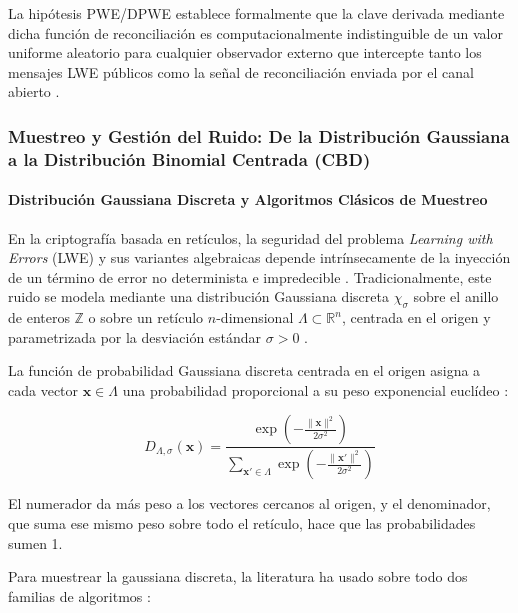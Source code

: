 La hipótesis PWE/DPWE establece formalmente que la clave derivada mediante dicha función de reconciliación es computacionalmente indistinguible de un valor uniforme aleatorio para cualquier observador externo que intercepte tanto los mensajes LWE públicos como la señal de reconciliación enviada por el canal abierto \cite{yang2025multiserver, rewal2023quantumsafe}.

\subsubsection{Muestreo y Gestión del Ruido: De la Distribución Gaussiana a la Distribución Binomial Centrada (CBD)}

\paragraph{Distribución Gaussiana Discreta y Algoritmos Clásicos de Muestreo}

En la criptografía basada en retículos, la seguridad del problema \textit{Learning with Errors} (LWE) y sus variantes algebraicas depende intrínsecamente de la inyección de un término de error no determinista e impredecible \cite{regev2009lwe, yang2025multiserver}. Tradicionalmente, este ruido se modela mediante una distribución Gaussiana discreta $\chi_\sigma$ sobre el anillo de enteros $\mathbb{Z}$ o sobre un retículo $n$-dimensional $\Lambda \subset \mathbb{R}^n$, centrada en el origen y parametrizada por la desviación estándar $\sigma > 0$ \cite{nguyen2019high, huang2018lattice, rewal2023quantumsafe}.

La función de probabilidad Gaussiana discreta centrada en el origen asigna a cada vector $\mathbf{x} \in \Lambda$ una probabilidad proporcional a su peso exponencial euclídeo \cite{huang2018lattice}:

\begin{equation}
D_{\Lambda, \sigma}(\mathbf{x}) = \frac{\exp\left(-\frac{\|\mathbf{x}\|^2}{2\sigma^2}\right)}{\sum_{\mathbf{x}' \in \Lambda} \exp\left(-\frac{\|\mathbf{x}'\|^2}{2\sigma^2}\right)}
\end{equation}

El numerador da más peso a los vectores cercanos al origen, y el denominador, que suma ese mismo peso sobre todo el retículo, hace que las probabilidades sumen 1.

Para muestrear la gaussiana discreta, la literatura ha usado sobre todo dos familias de algoritmos \cite{huang2018lattice, nguyen2019high}:

